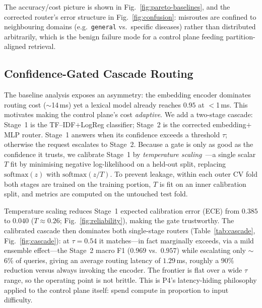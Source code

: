 \documentclass[runningheads]{llncs}
\begin{document}
The accuracy/cost picture is shown in Fig.~\ref{fig:pareto-baselines}, and the corrected router's error structure in Fig.~\ref{fig:confusion}: misroutes are confined to neighbouring domains (e.g.\ \texttt{general} vs.\ specific diseases) rather than distributed arbitrarily, which is the benign failure mode for a control plane feeding partition-aligned retrieval.

\subsection{Confidence-Gated Cascade Routing}
\label{sec:cascade}

The baseline analysis exposes an asymmetry: the embedding encoder dominates routing cost ($\sim$14\,ms) yet a lexical model already reaches $0.95$ at $<$1\,ms. This motivates making the control plane's cost \emph{adaptive}. We add a two-stage cascade: Stage~1 is the TF--IDF$+$LogReg classifier; Stage~2 is the corrected embedding$+$MLP router. Stage~1 answers when its confidence exceeds a threshold $\tau$; otherwise the request escalates to Stage~2. Because a gate is only as good as the confidence it trusts, we calibrate Stage~1 by \emph{temperature scaling}~\cite{guo2017}---a single scalar $T$ fit by minimising negative log-likelihood on a held-out split, replacing $\mathrm{softmax}(z)$ with $\mathrm{softmax}(z/T)$. To prevent leakage, within each outer CV fold both stages are trained on the training portion, $T$ is fit on an inner calibration split, and metrics are computed on the untouched test fold.

Temperature scaling reduces Stage~1 expected calibration error (ECE) from $0.385$ to $0.040$ ($T\!\approx\!0.26$; Fig.~\ref{fig:reliability}), making the gate trustworthy. The calibrated cascade then dominates both single-stage routers (Table~\ref{tab:cascade}, Fig.~\ref{fig:cascade}): at $\tau{=}0.54$ it matches---in fact marginally exceeds, via a mild ensemble effect---the Stage~2 macro F1 ($0.969$ vs.\ $0.957$) while escalating only $\sim$6\% of queries, giving an average routing latency of $1.29$\,ms, roughly a $90\%$ reduction versus always invoking the encoder. The frontier is flat over a wide $\tau$ range, so the operating point is not brittle. This is P4's latency-hiding philosophy applied to the control plane itself: spend compute in proportion to input difficulty.
\end{document}
